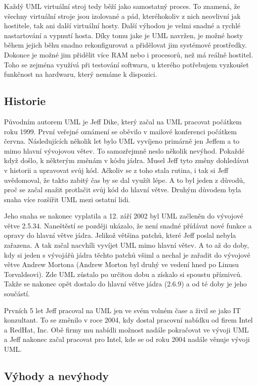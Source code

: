 Každý UML virtuální stroj tedy běží jako samostatný proces. To znamená, že všechny virtuální stroje jsou izolované a pád, kteréhokoliv z nich neovlivní jak hostitele, tak ani další virtuální hosty. Další výhodou je velmi snadné a rychlé nastartování a vypnutí hosta. Díky tomu jake je UML navržen, je možné hosty během jejich běhu snadno rekonfigurovat a přidělovat jim systémové prostředky. Dokonce je možné jim přidělit více RAM nebo i procesorů, než má reálně hostitel. Toho se zejména využívá při testování softwaru, u kterého potřebujem vyzkoušet funkčnost na hardwaru, který nemáme k dispozici.
\subsection{Historie}
Původním autorem UML je Jeff Dike, který začal na UML pracovat počátkem roku 1999. První veřejné oznámení se oběvilo v mailové konferenci počátkem června. Následujících několik let bylo UML vyvíjeno primárně jen Jeffem a to mimo hlavní vývojovou větev. To samozřejmně neslo několik nevýhod. Pokaždé když došlo, k některým změnám v kódu jádra. Musel Jeff tyto změny dohledávat v historii a upravovat svůj kód. Ačkoliv se z toho stala rutina, i tak si Jeff uvědomoval, že takto zabitý čas by se dal využít lépe. A to byl jeden z důvodů, proč se začal snažit protlačit svůj kód do hlavní větve. Druhým důvodem byla snaha více rozšířit UML mezi ostatní lidi.

Jeho snaha se nakonec vyplatila a 12. září 2002 byl UML začleněn do vývojové větve 2.5.34. Naneštěstí se později ukázalo, že není snadné přídávat nové funkce a opravy do hlavní větve jádra. Jelikož většina patchů, které Jeff poslal nebyla zařazena. A tak začal nacvhíli vyvíjet UML mimo hlavní větev. A to až do doby, kdy si jeden s vývojářů jádra těchto patchů všiml a nechal je zařadit do vývojové větve Andrew Mortona (Andrew Morton byl druhý ve vedení hned po Linusu Torvaldsovi). Zde UML zůstalo po určitou dobu a získalo si spoustu příznivců. Takže se nakonec opět dostalo do hlavní větve jádra (2.6.9) a od té doby je jeho součástí.

Prvních 5 let Jeff pracoval na UML jen ve svém volném čase a živil se jako IT konzultant. To se změnilo v roce 2004, kdy dostal pracovní nabídku od firem Intel a RedHat, Inc. Obě firmy mu nabídli možnost nadále pokračovat ve vývoji UML a Jeff nakonec začal pracovat pro Intel, kde se od roku 2004 nadále věnuje vývoji UML.

\subsection{Výhody a nevýhody}
